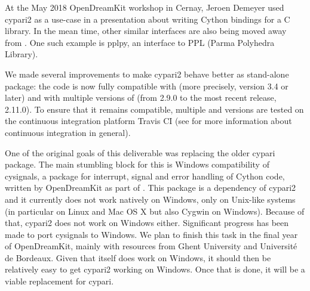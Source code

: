 \documentclass{deliverablereport}
\begin{document}
At the May 2018 OpenDreamKit workshop in Cernay,
Jeroen Demeyer used cypari2 as a use-case in a presentation
about writing Cython bindings for a C library.
In the mean time,
other similar interfaces are also being moved away from \Sage.
One such example is pplpy, an interface to PPL (Parma Polyhedra Library).

We made several improvements to make cypari2 behave better as stand-alone package:
the code is now fully compatible with  (more precisely, version 3.4 or later)
and with multiple versions of \PariGP (from 2.9.0 to the most recent release, 2.11.0).
To ensure that it remains compatible, multiple \Python and \PariGP
versions are tested on the continuous integration platform Travis CI
(see 
for more information about continuous integration in general).

One of the original goals of this deliverable was replacing the older cypari package.
The main stumbling block for this is Windows compatibility of cysignals,
a package for interrupt, signal and error handling
of Cython code, written by OpenDreamKit as part of .
This package is a dependency of cypari2 and it
currently does not work natively on Windows,
only on Unix-like systems
(in particular on Linux and Mac OS X but also Cygwin on Windows).
Because of that, cypari2 does not work on Windows either.
Significant progress has been made to port cysignals to Windows.
We plan to finish this task in the final year of OpenDreamKit,
mainly with resources from Ghent University and Universit\'e de Bordeaux.
Given that \PariGP itself does work on Windows,
it should then be relatively easy to get cypari2 working on Windows.
Once that is done, it will be a viable replacement for cypari.
\end{document}
